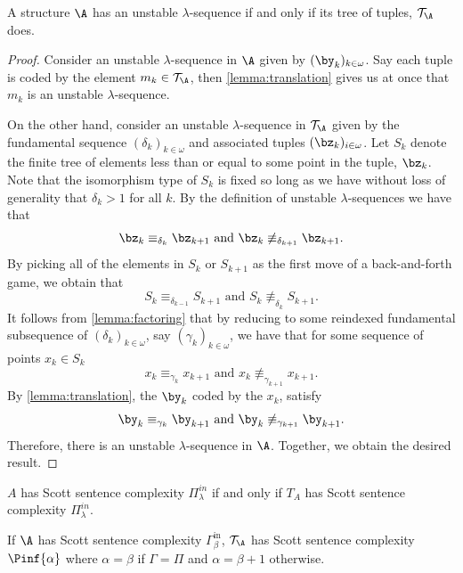 \documentclass{amsart}
\newcommand{\T}{{\mathcal{T}}}
\begin{document}
\begin{lemma}
A structure $\A$ has an unstable $\lambda$-sequence if and only if its tree of
tuples, $\T_\A$ does.
\end{lemma}

\begin{proof}
   Consider an unstable $\lambda$-sequence in $\A$ given by $(\by_k)_{k\in\omega}$. 
Say each tuple is coded by the element $m_k\in \T_\A$, then \cref{lemma:translation} gives us at once that $m_k$ is an unstable $\lambda$-sequence. 

On the other hand, consider an unstable $\lambda$-sequence in $\T_\A$ given by the fundamental
sequence $(\delta_k)_{k\in\omega}$ and associated tuples $(\bz_k)_{i\in\omega}$. 
Let $S_k$ denote the finite tree of elements less than or equal to some point in
the tuple, $\bz_k$.
Note that the isomorphism type of $S_k$ is fixed so long as we have without loss of generality that $\delta_k>1$ for all $k$.
By the definition of unstable $\lambda$-sequences we have that
\[\bz_{k}\equiv_{\delta_{k}}\bz_{k+1} \text{  and  }
\bz_{k}\not\equiv_{\delta_{k+1}}\bz_{k+1}.\]
By picking all of the elements in $S_k$ or $S_{k+1}$ as the first move of a back-and-forth game, we obtain that
\[S_{k}\equiv_{\delta_{k-1}}S_{k+1} \text{  and  }
S_{k}\not\equiv_{\delta_{k}}S_{k+1}.\]
It follows from \cref{lemma:factoring} that by reducing to some reindexed
fundamental subsequence of $(\delta_k)_{k\in\omega}$, say $(\gamma_k)_{k\in\omega}$, we have that for some sequence of points $x_k \in S_k$
\[x_{k}\equiv_{\gamma_{k}}x_{k+1} \text{  and  }
x_{k}\not\equiv_{\gamma_{k+1}}x_{k+1}.\]
By \cref{lemma:translation}, the $\by_k$ coded by the $x_k$, satisfy 
\[\by_{k}\equiv_{\gamma_{k}}\by_{k+1} \text{  and  }
\by_{k}\not\equiv_{\gamma_{k+1}}\by_{k+1}.\]
Therefore, there is an unstable $\lambda$-sequence in $\A$.
Together, we obtain the desired result.
\end{proof}

\begin{corollary}\label{cor:fs_limitssc}
$A$ has Scott sentence complexity $\Pi_\lambda^{in}$ if and only if $T_A$ has Scott sentence complexity $\Pi_\lambda^{in}$.
\end{corollary}

\begin{corollary}
   If $\A$ has Scott sentence complexity $\Gamma_\beta^{\mathrm{in}}$,
   $\T_\A$ has Scott sentence complexity $\Pinf{\alpha}$ where $\alpha=\beta$ if $\Gamma=\Pi$ and $\alpha=\beta+1$ otherwise.
\end{corollary}
\end{document}
